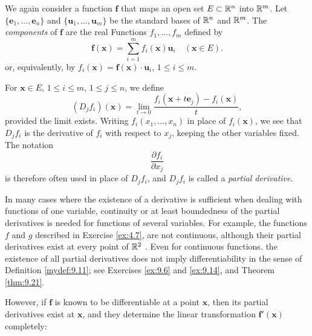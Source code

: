 
\begin{mydef}
    \label{mydef:9.16}
    We again consider a function $\mathbf{f}$ that maps an open set $E \subset {\protect\mathbb R}^n$ into ${\protect\mathbb R}^m$.
    Let $\{\mathbf{e}_1, \dots, \mathbf{e}_n\}$
    and $\{\mathbf{u}_1, \dots, \mathbf{u}_m\}$
    be the standard bases of ${\protect\mathbb R}^n$ and ${\protect\mathbb R}^m$.
    The \emph{components} of $\mathbf{f}$ are the real Functions
    $f_1, \dots, f_m$ defined by
    \begin{equation}
        \label{eq:9.24}
        \mathbf{f(x)} =
        \sum_{i=1}^{m} f_i(\mathbf{x}) \mathbf{u}_i
        \quad
        (\mathbf{x} \in E).
    \end{equation}
    or, equivalently, by $f_i(\mathbf{x}) = \mathbf{f(x)}\cdot \mathbf{u}_i$, $1 \leq i \leq m$.

    For $\mathbf{x} \in E$, $1 \leq i \leq m$, $1 \leq j \leq n$, we define
    \begin{equation}
        \label{eq:9.25}
        (D_j f_i)(\mathbf{x}) =
        \lim_{t \to 0} \frac{f_i(\mathbf{x} + t \mathbf{e}_j) - f_i (\mathbf{x})}{t},
    \end{equation}
    provided the limit exists.
    Writing $f_i(x_1 , ... , x_n)$ in place of $f_i(\mathbf{x})$, we see that $D_j f_i$ is the derivative of $f_i$ with respect to $x_j$, keeping the other variables fixed.
    The notation
    \begin{equation}
        \label{eq:9.26}
        \frac{\partial f_i}{\partial x_j}
    \end{equation}
    is therefore often used in place of $D_j f_i$,
    and $D_j f_i$ is called a \emph{partial derivative}.
\end{mydef}

In many cases where the existence of a derivative is sufficient when dealing
with functions of one variable,
continuity or at least boundedness of the partial derivatives is needed for functions of several variables.
For example, the functions $f$ and $g$ described in Exercise \ref{ex:4.7},
are not continuous,
although their partial derivatives exist at every point of ${\protect\mathbb R}^2$ .
Even for continuous functions.
the existence of all partial derivatives does not imply differentiability in the sense
of Definition \ref{mydef:9.11};
see Exercises \ref{ex:9.6} and \ref{ex:9.14}, and Theorem \ref{thm:9.21}.

However, if $\mathbf{f}$ is known to be differentiable at a point $\mathbf{x}$,
then its partial derivatives exist at $\mathbf{x}$,
and they determine the linear transformation $\mathbf{f'(x)}$ completely:

